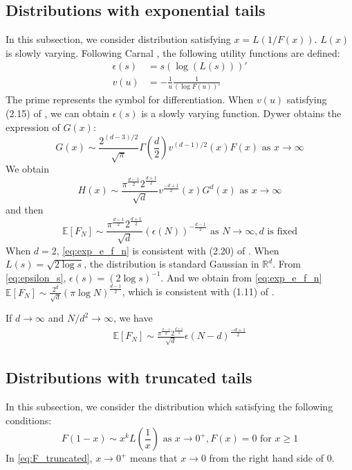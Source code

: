 \documentclass{aptpub}
\def\E{\mathbb{E}}
\def\R{\mathbb{R}}
\begin{document}
\subsection{Distributions with exponential tails}
In this subsection, we consider distribution satisfying
$x = L(1/F(x)) $. $L(x)$ is slowly varying. Following Carnal \cite{carnal1970konvexe},
the following utility functions are defined:
\begin{align}
     \epsilon(s) & = s (\log (L(s)))' \label{eq:epsilon_s}\\
     v(u) &= -\frac{1}{u} \frac{1}{(\log F(u))'}    
\end{align}
The prime represents the symbol for differentiation. When $v(u)$ satisfying
(2.15) of \cite{carnal1970konvexe},
we can obtain $\epsilon(s)$ is a slowly varying function.
Dywer \cite{dwyer1991convex} obtains the expression of $G(x)$:
\begin{equation}\label{eq:G_x_exp}
     G(x) \sim \frac{2^{(d-3)/2}}{\sqrt{\pi}}\Gamma(\frac{d}{2}) v^{(d-1)/2}(x) F(x)
      \textrm{ as } x\to \infty
\end{equation}
We obtain 
\begin{equation}\label{eq:H_x_exp}
     H(x) \sim \frac{\pi^{\frac{d-1}{2}} 2^{\frac{d+1}{2}}}{\sqrt{d}}v^{\frac{-d+1}{2}}(x)G^d(x)
     \textrm{ as } x\to \infty
\end{equation}
 and then
 \begin{equation}\label{eq:exp_e_f_n}
     \E[F_N]\sim \frac{\pi^{\frac{d-1}{2}} 2^{\frac{d+1}{2}}}{\sqrt{d}} (\epsilon(N))^{-\frac{d-1}{2}}
     \textrm{ as } N \to \infty, d \textrm { is fixed}
 \end{equation}
 When $d=2$, \eqref{eq:exp_e_f_n} is consistent with (2.20) of \cite{carnal1970konvexe}.
 When $L(s)=\sqrt{2\log s}$, the distribution is standard Gaussian in $\R^d$.
 From \eqref{eq:epsilon_s}, $\epsilon(s) = (2\log s)^{-1}$. And we obtain from \eqref{eq:exp_e_f_n}
 $\E[F_N]\sim \frac{2^d}{\sqrt{d}}(\pi \log N)^{\frac{d-1}{2}}$,
 which is consistent with (1.11) of \cite{raynaud1970enveloppe}.

 If $d\to\infty$ and $N/d^2\to \infty$, we have
\begin{align}\label{eq:d_infty_exp_E_F_N}
      \E[F_N]\sim \frac{\pi^{\frac{d-1}{2}} 2^{\frac{d+1}{2}}}{\sqrt{d}} \epsilon(N-d)^{\frac{-d+1}{2}}
\end{align}
\subsection{Distributions with truncated tails}
In this subsection, we consider the distribution which satisfying the following conditions:
\begin{equation}\label{eq:F_truncated}
     F(1-x) \sim x^k L(\frac{1}{x})  \text{ as } x \to 0^+,
     F(x) = 0 \text{ for } x \geq 1
\end{equation}
In \eqref{eq:F_truncated}, $x \to 0^+$ means that $x\to 0$ from the right hand side of $0$.
\end{document}
